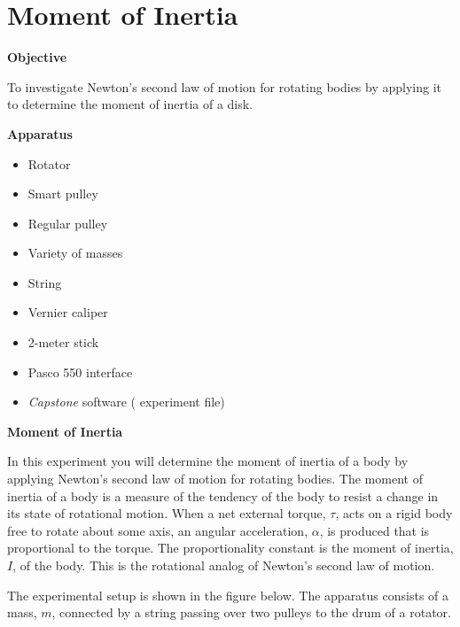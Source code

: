 
\section{Moment of Inertia}

\makelabheader %

\medskip
\textbf{Objective} 

To investigate Newton's second law of motion for rotating bodies by applying
it to determine the moment of inertia of a disk.

\medskip
\textbf{Apparatus}

\begin{itemize}[nosep]
\item Rotator
\item Smart pulley
\item Regular pulley
\item Variety of masses
\item String
\item Vernier caliper
\item 2-meter stick
\item Pasco 550 interface
\item \textit{Capstone} software ( experiment file)
\end{itemize}

\textbf{Moment of Inertia} 

In this experiment you will determine the moment of inertia of a body by applying
Newton's second law of motion for rotating bodies. The moment of inertia of
a body is a measure of the tendency of the body to resist a change in its state
of rotational motion. When a net external torque, 
$\tau$, acts on a rigid body free
to rotate about some axis, an angular acceleration, 
$\alpha$, is produced that is
proportional to the torque. The proportionality constant is the moment of inertia,
$I$, of the body. This is the rotational analog of Newton's second law of motion. 

The experimental setup is shown in the figure below. The apparatus consists
of a mass, $m$, connected by a string passing over two pulleys to the drum of
a rotator.

